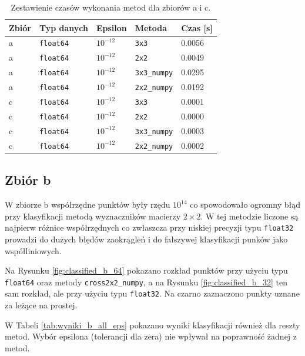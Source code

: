 \documentclass[11pt,a4paper]{article}
\begin{document}
\begin{table}[htbp]
    \centering
    \caption{Zestawienie czasów wykonania metod dla zbiorów a i c.}
    \label{tab:wyniki_ac_12_minimal}
    \begin{tabular}{lllll}
        \toprule
        Zbiór & Typ danych & Epsilon & Metoda & Czas [s] \\
        \midrule
        a & \texttt{float64} & $10^{-12}$ & \texttt{3x3}        & 0.0056 \\
        a & \texttt{float64} & $10^{-12}$ & \texttt{2x2}        & 0.0049 \\
        a & \texttt{float64} & $10^{-12}$ & \texttt{3x3\_numpy} & 0.0295 \\
        a & \texttt{float64} & $10^{-12}$ & \texttt{2x2\_numpy} & 0.0192 \\
        \midrule
        c & \texttt{float64} & $10^{-12}$ & \texttt{3x3}        & 0.0001 \\
        c & \texttt{float64} & $10^{-12}$ & \texttt{2x2}        & 0.0000 \\
        c & \texttt{float64} & $10^{-12}$ & \texttt{3x3\_numpy} & 0.0003 \\
        c & \texttt{float64} & $10^{-12}$ & \texttt{2x2\_numpy} & 0.0002 \\
        \bottomrule
    \end{tabular}
\end{table}

\subsection{Zbiór b}

W zbiorze b współrzędne punktów były rzędu $10^{14}$ co spowodowało ogromny błąd przy klasyfikacji metodą wyznaczników macierzy $2 \times 2$. W tej metodzie liczone są najpierw różnice współrzędnych co zwłaszcza przy niskiej precyzji typu \texttt{float32} prowadzi do dużych błędów zaokrągleń i do fałszywej klasyfikacji punków jako współliniowych. 

Na Rysunku \ref{fig:classified_b_64} pokazano rozkład punktów przy użyciu typu \texttt{float64} oraz metody \texttt{cross2x2\_numpy}, a na Rysunku \ref{fig:classified_b_32} ten sam rozkład, ale przy użyciu typu \texttt{float32}. Na czarno zaznaczono punkty uznane za leżące na prostej. 

W Tabeli \ref{tab:wyniki_b_all_eps} pokazano wyniki klasyfikacji również dla reszty metod.
Wybór epsilona (tolerancji dla zera) nie wpływał na poprawność żadnej z metod.
\end{document}
